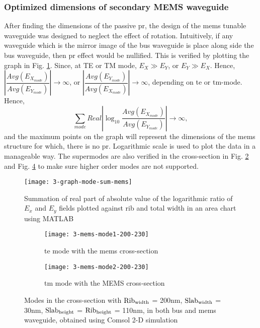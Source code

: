 \documentclass[../report.tex]{subfiles}
\begin{document}
\subsubsection{Optimized dimensions of secondary MEMS waveguide}
After finding the dimensions of the passive \gls{pr}, the design of the \gls{mems} tunable waveguide was designed to neglect the effect of rotation. Intuitively, if any waveguide which is the mirror image of the bus waveguide is place along side the bus waveguide, then \gls{pr} effect would be nullified. This is verified by plotting the graph in Fig. \ref{fig:3_graph_mode_sum_mems}. Since, at TE or TM mode, $E_X \gg E_Y$, or $E_Y \gg E_X$. Hence, $\left|\dfrac {Avg(E_{X_{mode}})} {Avg(E_{Y_{mode}})}\right| \rightarrow \infty$, or $\left|\dfrac {Avg(E_{Y_{mode}})} {Avg(E_{X_{mode}})}\right| \rightarrow \infty$, depending on \gls{te} or \gls{tm}-mode.
Hence, 
\begin{equation}\label{eq:mems_dim_eq}
\sum _{mode}Real\left| \log _{10}\dfrac {Avg(E_{X_{mode}})} {Avg(E_{Y_{mode}})}\right| \rightarrow \infty,
\end{equation}
and the maximum points on the graph will represent the dimensions of the \gls{mems} structure for which, there is no \gls{pr}. Logarithmic scale is used to plot the data in a manageable way. The supermodes are also verified in the cross-section in Fig. \ref{fig:3_mems_mode1_200_230} and Fig. \ref{fig:3_mems_mode2_200_230} to make sure higher order modes are not supported.

\begin{figure}[H] %
	\centering
	\texttt{[image: 3-graph-mode-sum-mems]}
	\caption{Summation of real part of absolute value of the logarithmic ratio of $E_x$ and $E_y$ fields plotted against rib and total width in an area chart using MATLAB}
	\label{fig:3_graph_mode_sum_mems}
\end{figure}
		
\begin{figure}[H] %
	\begin{subfigure}[t]{0.45\textwidth}
		\texttt{[image: 3-mems-mode1-200-230]}
		\caption{\gls{te} mode with the \gls{mems} cross-section}
		\label{fig:3_mems_mode1_200_230}
	\end{subfigure}
	\hfill
	\begin{subfigure}[t]{0.45\textwidth}
		\texttt{[image: 3-mems-mode2-200-230]}
		\caption{\gls{tm} mode with the MEMS cross-section}
		\label{fig:3_mems_mode2_200_230}
	\end{subfigure}
	\caption{Modes in the cross-section with $\mathrm{Rib_{width}}$ = 200nm, $\mathrm{Slab_{width}}$ = 30nm, $\mathrm{Slab_{height}}$ = $\mathrm{Rib_{height}}$ = 110nm, in both bus and \gls{mems} waveguide, obtained using Comsol 2-D simulation}
\end{figure}
\end{document}
